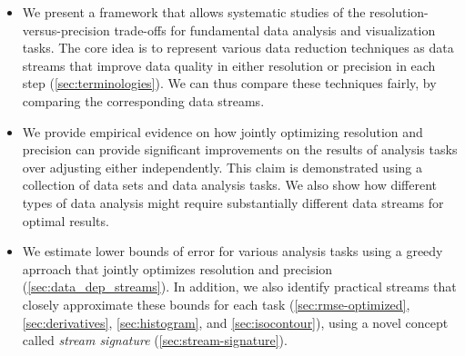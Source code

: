 \begin{itemize}
\item We present a framework that allows systematic studies of the resolution-versus-precision
  trade-offs for fundamental data analysis and visualization tasks. The core idea is to represent
  various data reduction techniques as data streams that improve data quality in either resolution
  or precision in each step (\autoref{sec:terminologies}). We can thus compare these techniques
  fairly, by comparing the corresponding data streams.
   
\item We provide empirical evidence on how jointly optimizing resolution and precision can provide
  significant improvements on the results of analysis tasks over adjusting either independently.
  This claim is demonstrated using a collection of data sets and data analysis tasks. We also show
  how different types of data analysis might require substantially different data streams for
  optimal results.

\item We estimate lower bounds of error for various analysis tasks using a greedy aprroach that
  jointly optimizes resolution and precision (\autoref{sec:data_dep_streams}). In addition, we also
  identify practical streams that closely approximate these bounds for each task
  (\autoref{sec:rmse-optimized}, \autoref{sec:derivatives}, \autoref{sec:histogram}, and
  \autoref{sec:isocontour}), using a novel concept called \emph{stream signature}
  (\autoref{sec:stream-signature}).
\end{itemize}

